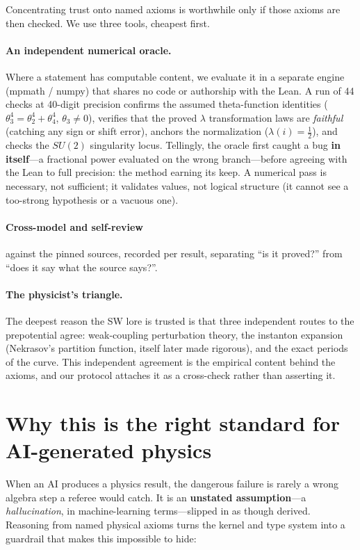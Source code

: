 \documentclass[11pt]{article}
\begin{document}
Concentrating trust onto named axioms is worthwhile only if those axioms are then checked. We
use three tools, cheapest first.

\paragraph{An independent numerical oracle.} Where a statement has computable content, we
evaluate it in a separate engine (mpmath / numpy) that shares no code or authorship with the
Lean. A run of 44 checks at 40-digit precision confirms the assumed theta-function identities
($\theta_3^4 = \theta_2^4 + \theta_4^4$, $\theta_3 \neq 0$), verifies that the proved $\lambda$
transformation laws are \emph{faithful} (catching any sign or shift error), anchors the
normalization ($\lambda(i) = \tfrac12$), and checks the $SU(2)$ singularity locus. Tellingly,
the oracle first caught a bug \textbf{in itself}---a fractional power evaluated on the wrong
branch---before agreeing with the Lean to full precision: the method earning its keep. A
numerical pass is necessary, not sufficient; it validates values, not logical structure (it
cannot see a too-strong hypothesis or a vacuous one).

\paragraph{Cross-model and self-review} against the pinned sources, recorded per result,
separating ``is it proved?'' from ``does it say what the source says?''.

\paragraph{The physicist's triangle.} The deepest reason the SW lore is trusted is that three
independent routes to the prepotential agree: weak-coupling perturbation theory, the instanton
expansion (Nekrasov's partition function, itself later made rigorous), and the exact periods of
the curve. This independent agreement is the empirical content behind the axioms, and our
protocol attaches it as a cross-check rather than asserting it.

\section{Why this is the right standard for AI-generated physics}

When an AI produces a physics result, the dangerous failure is rarely a wrong algebra step a
referee would catch. It is an \textbf{unstated assumption}---a \emph{hallucination}, in
machine-learning terms---slipped in as though derived. Reasoning from named physical axioms
turns the kernel and type system into a guardrail that makes this impossible to hide:
\end{document}
